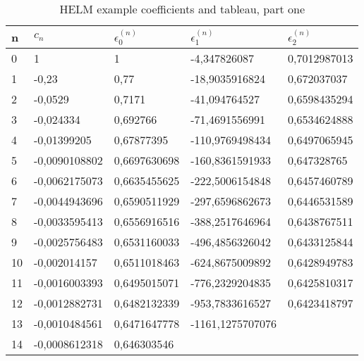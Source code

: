 \begin{table}[h]
	\small
	\begin{tabular}{|l|l|l|l|l|}
		n	& $c_n$			& $\epsilon_0^{(n)}$	& $\epsilon_1^{(n)}$	& $\epsilon_2^{(n)}$ \\ \hline
		0	& 1				& 1						& -4,347826087			& 0,7012987013 \\
		1	& -0,23			& 0,77					& -18,9035916824		& 0,672037037 \\
		2	& -0,0529		& 0,7171				& -41,094764527			& 0,6598435294 \\
		3	& -0,024334		& 0,692766				& -71,4691556991		& 0,6534624888 \\
		4	& -0,01399205	& 0,67877395			& -110,9769498434		& 0,6497065945 \\
		5	& -0,0090108802	& 0,6697630698			& -160,8361591933		& 0,647328765 \\
		6	& -0,0062175073	& 0,6635455625			& -222,5006154848		& 0,6457460789 \\
		7	& -0,0044943696	& 0,6590511929			& -297,6596862673		& 0,6446531589 \\
		8	& -0,0033595413	& 0,6556916516			& -388,2517646964		& 0,6438767511 \\
		9	& -0,0025756483	& 0,6531160033			& -496,4856326042		& 0,6433125844 \\
		10	& -0,002014157	& 0,6511018463			& -624,8675009892		& 0,6428949783 \\
		11	& -0,0016003393	& 0,6495015071			& -776,2329204835		& 0,6425810317 \\
		12	& -0,0012882731	& 0,6482132339			& -953,7833616527		& 0,6423418797 \\
		13	& -0,0010484561	& 0,6471647778			& -1161,1275707076 \\
		14	& -0,0008612318	& 0,646303546
	\end{tabular}
	\caption{HELM example coefficients and tableau, part one}
	\label{tab:helm_example_data_one}
\end{table}

